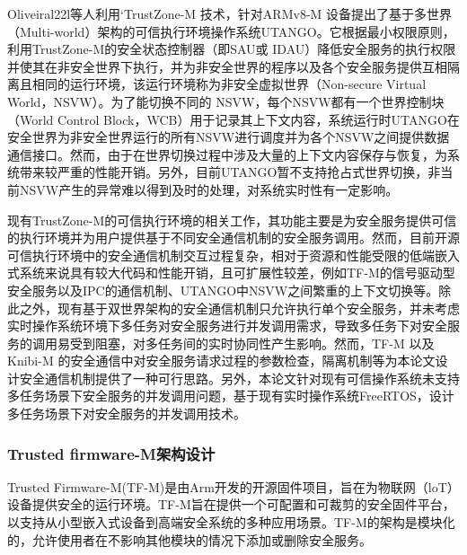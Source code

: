 \documentclass[12pt,a4paper]{ctexart}
\begin{document}
\par Oliveiral22l等人利用‘TrustZone-M 技术，针对ARMv8-M 设备提出了基于多世界（Multi-world）架构的可信执行环境操作系统UTANGO。它根据最小权限原则，利用TrustZone-M的安全状态控制器（即SAU或 IDAU）降低安全服务的执行权限并使其在非安全世界下执行，并为非安全世界的程序以及各个安全服务提供互相隔离且相同的运行环境，该运行环境称为非安全虚拟世界（Non-secure Virtual World，NSVW）。为了能切换不同的 NSVW，每个NSVW都有一个世界控制块（World Control Block，WCB）用于记录其上下文内容，系统运行时UTANGO在安全世界为非安全世界运行的所有NSVW进行调度并为各个NSVW之间提供数据通信接口。然而，由于在世界切换过程中涉及大量的上下文内容保存与恢复，为系统带来较严重的性能开销。另外，目前UTANGO暂不支持抢占式世界切换，非当前NSVW产生的异常难以得到及时的处理，对系统实时性有一定影响。
\par 现有TrustZone-M的可信执行环境的相关工作，其功能主要是为安全服务提供可信的执行环境并为用户提供基于不同安全通信机制的安全服务调用。然而，目前开源可信执行环境中的安全通信机制交互过程复杂，相对于资源和性能受限的低端嵌入式系统来说具有较大代码和性能开销，且可扩展性较差，例如TF-M的信号驱动型安全服务以及IPC的通信机制、UTANGO中NSVW之间繁重的上下文切换等。除此之外，现有基于双世界架构的安全通信机制只允许执行单个安全服务，并未考虑实时操作系统环境下多任务对安全服务进行并发调用需求，导致多任务下对安全服务的调用易受到阻塞，对多任务间的实时协同性产生影响。然而，TF-M 以及Knibi-M 的安全通信中对安全服务请求过程的参数检查，隔离机制等为本论文设计安全通信机制提供了一种可行思路。另外，本论文针对现有可信操作系统未支持多任务场景下安全服务的并发调用问题，基于现有实时操作系统FreeRTOS，设计多任务场景下对安全服务的并发调用技术。

\subsubsection{ Trusted firmware-M架构设计}
\par Trusted Firmware-M(TF-M)是由Arm开发的开源固件项目，旨在为物联网（loT）设备提供安全的运行环境。TF-M旨在提供一个可配置和可裁剪的安全固件平台，以支持从小型嵌入式设备到高端安全系统的多种应用场景。TF-M的架构是模块化的，允许使用者在不影响其他模块的情况下添加或删除安全服务。
\end{document}
